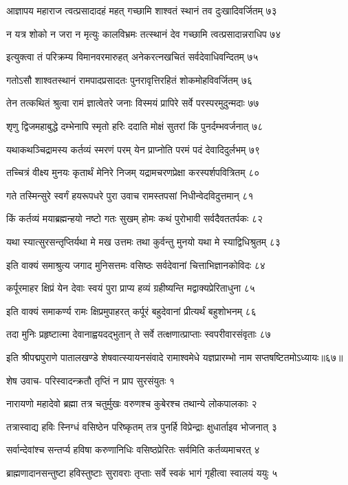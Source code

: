 आज्ञापय महाराज त्वत्प्रसादादहं महत्
गच्छामि शाश्वतं स्थानं तव दुःखादिवर्जितम् ७३

न यत्र शोको न जरा न मृत्युः कालविभ्रमः
तत्स्थानं देव गच्छामि त्वत्प्रसादान्नराधिप ७४

इत्युक्त्वा तं परिक्रम्य विमानवरमारुहत्
अनेकरत्नखचितं सर्वदेवाधिवन्दितम् ७५

गतोऽसौ शाश्वतस्थानं रामपादप्रसादतः
पुनरावृत्तिरहितं शोकमोहविवर्जितम् ७६

तेन तत्कथितं श्रुत्वा रामं ज्ञात्वेतरे जनाः
विस्मयं प्रापिरे सर्वे परस्परमुदुन्मदाः ७७

शृणु द्विजमहाबुद्धे दम्भेनापि स्मृतो हरिः
ददाति मोक्षं सुतरां किं पुनर्दम्भवर्जनात् ७८

यथाकथञ्चिद्रामस्य कर्तव्यं स्मरणं परम्
येन प्राप्नोति परमं पदं देवादिदुर्लभम् ७९

तच्चित्रं वीक्ष्य मुनयः कृतार्थं मेनिरे निजम्
यद्रामचरणप्रेक्षा करस्पर्शपवित्रितम् ८०

गते तस्मिन्सुरे स्वर्गं हयरूपधरे पुरा
उवाच रामस्तपसां निधीन्वेदविदुत्तमान् ८१

किं कर्तव्यं मयाब्रह्मन्हयो नष्टो गतः सुखम्
होमः कथं पुरोभावी सर्वदैवततर्पकः ८२

यथा स्यात्सुरसन्तृप्तिर्यथा मे मख उत्तमः
तथा कुर्वन्तु मुनयो यथा मे स्याद्विधिश्रुतम् ८३

इति वाक्यं समाश्रुत्य जगाद मुनिसत्तमः
वसिष्ठः सर्वदेवानां चित्ताभिज्ञानकोविदः ८४

कर्पूरमाहर क्षिप्रं येन देवाः स्वयं पुरा
प्राप्य हव्यं ग्रहीष्यन्ति मद्वाक्यप्रेरिताधुना ८५

इति वाक्यं समाकर्ण्य रामः क्षिप्रमुपाहरत्
कर्पूरं बहुदेवानां प्रीत्यर्थं बहुशोभनम् ८६

तदा मुनिः प्रहृष्टात्मा देवानाह्वयदद्भुतान्
ते सर्वे तत्क्षणात्प्राप्ताः स्वपरीवारसंवृताः ८७

इति श्रीपद्मपुराणे पातालखण्डे शेषवात्स्यायनसंवादे रामाश्वमेधे यज्ञप्रारम्भो नाम सप्तषष्टितमोऽध्यायः॥६७॥


शेष उवाच-
परिस्वादन्क्रतौ तृप्तिं न प्राप सुरसंयुतः १

नारायणो महादेवो ब्रह्मा तत्र चतुर्मुखः
वरुणश्च कुबेरश्च तथान्ये लोकपालकाः २

तत्रास्वाद्य हविः स्निग्धं वसिष्ठेन परिष्कृतम्
तत्र पुनर्हि विप्रेन्द्राः क्षुधार्ताइव भोजनात् ३

सर्वान्देवांश्च सन्तर्प्य हविषा करुणानिधिः
वसिष्ठप्रेरितः सर्वमिति कर्तव्यमाचरत् ४

ब्राह्मणादानसन्तुष्टा हविस्तुष्टाः सुरावराः
तृप्ताः सर्वे स्वकं भागं गृहीत्वा स्वालयं ययुः ५

